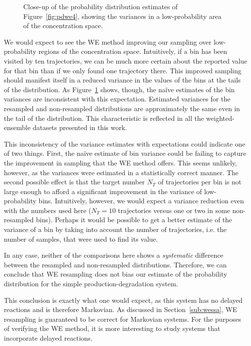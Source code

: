 \documentclass[english,letterpaper,12pt]{report}
\begin{document}
\begin{doublespacing}
\begin{figure}[ht]
    \begin{center}
        
    \end{center}
    \caption{Close-up of the probability distribution estimates of Figure~\ref{fig:pdwe4}, showing the variances in a low-probability area of the concentration space.}
    \label{fig:pdwe-varcloseup}
\end{figure}

We would expect to see the WE method improving our sampling over low-probability regions of the concentration space. Intuitively, if a bin has been visited by ten trajectories, we can be much more certain about the reported value for that bin than if we only found one trajectory there. This improved sampling should manifest itself in a reduced variance in the values of the bins at the tails of the distribution. As Figure~\ref{fig:pdwe-varcloseup} shows, though, the na\"ive estimates of the bin variances are inconsistent with this expectation. Estimated variances for the resampled and non-resampled distributions are approximately the same even in the tail of the distribution. This characteristic is reflected in all the weighted-ensemble datasets presented in this work.

This inconsistency of the variance estimates with expectations could indicate one of two things. First, the na\"ive estimate of bin variance could be failing to capture the improvement in sampling that the WE method offers. This seems unlikely, however, as the variances were estimated in a statistically correct manner. The second possible effect is that the target number $N_T$ of trajectories per bin is not large enough to afford a significant improvement in the variance of low-probability bins. Intuitively, however, we would expect a variance reduction even with the numbers used here ($N_T = 10$ trajectories versus one or two in some non-resampled bins). Perhaps it would be possible to get a better estimate of the variance of a bin by taking into account the number of trajectories, i.e. the number of samples, that were used to find its value.

In any case, neither of the comparisons here shows a \emph{systematic} difference between the resampled and non-resampled distributions. Therefore, we can conclude that WE resampling does not bias our estimate of the probability distribution for the simple production-degradation system.

This conclusion is exactly what one would expect, as this system has no delayed reactions and is therefore Markovian. As discussed in Section~\ref{sub:wessa}, WE resampling is guaranteed to be correct for Markovian systems. For the purposes of verifying the WE method, it is more interesting to study systems that incorporate delayed reactions.


\end{doublespacing}
\end{document}
